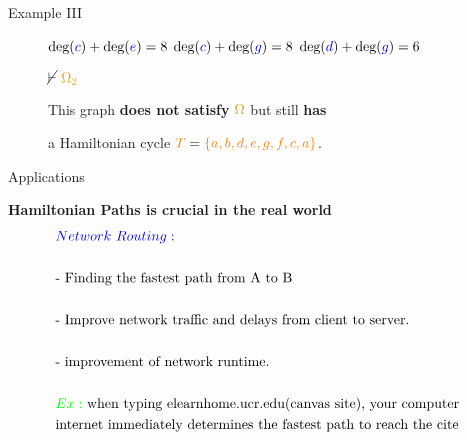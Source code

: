 \documentclass[pdf]{beamer}
\newcommand{\T}{\textcolor{orange}{T}}
\newcommand{\bluec}{\textcolor{blue}{c}}
\newcommand{\blued}{\textcolor{blue}{d}}
\newcommand{\bluee}{\textcolor{blue}{e}}
\newcommand{\blueg}{\textcolor{blue}{g}}
\newcommand{\ore}{\textcolor{gold}{\Omega}}
\newcommand{\oresecondcond}{\textcolor{gold}{\Omega_2}}
\newcommand{\gdeg}{\text{deg}}
\begin{document}
\begin{frame}{Example III}
\begin{figure}
{            \pause

            $\gdeg(\bluec) + \gdeg(\bluee) = 8$ \qquad
            $\gdeg(\bluec) + \gdeg(\blueg) = 8$ \qquad
            $\gdeg(\blued) + \gdeg(\blueg) = 6$}

            \pause

            $\cancel\vdash \text{ } \oresecondcond$

            \pause

            \vspace{5px}

            This graph \textbf{does not satisfy} $\ore$ but still \textbf{has}
            
            a Hamiltonian cycle $\T = \textcolor{orange}{\{a,b,d,e,g,f,c,a\}}$.
        \end{figure}
    \end{frame}

    \begin{frame}{Applications}

   
    \textbf{Hamiltonian Paths is crucial in the real world}\\
   \begin{align*}
    &\textcolor{blue}{Network}\text{ }\textcolor{blue}{Routing: }\\
    &\\
    &\text{- Finding the fastest path from A to B}\\
    &\\
    &\text{- Improve network traffic and delays from client to server. }\\
    &\\
    &\text{- improvement of network runtime. }\\
    &\\
    &\textcolor{green}{ Ex:} \text{ when typing elearnhome.ucr.edu(canvas site), your computer}\\
    &\text{internet immediately determines the fastest path to reach the cite }
   \end{align*}
    \end{frame}
\end{document}
